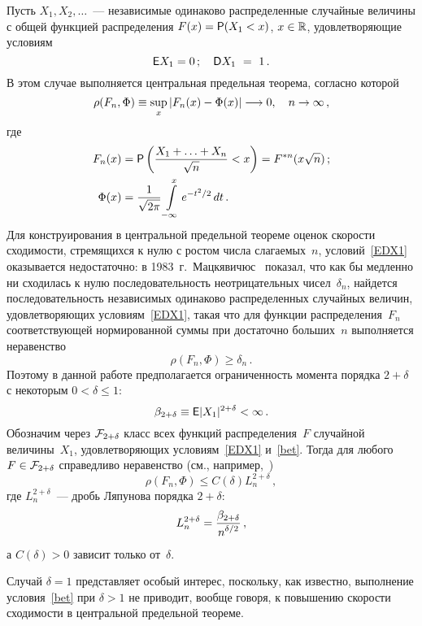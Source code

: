 \begin{multicols}{2}
Пусть $X_1,X_2,\ldots$~--- независимые одинаково распределенные
случайные величины с общей функцией распределения
${F(x)={\sf P}(X_1<x)}$, ${x\in\mathbb R}$, удов\-ле\-тво\-ря\-ющие условиям
\begin{equation}
\label{EDX1}
{\sf E} X_1 =  0\,;\quad{\sf D} X_1\ =\ 1\,.
\end{equation}
В этом случае выполняется центральная предельная теорема, согласно
которой
$$
\rho(F_n,\Phi)\equiv\sup_x|F_n(x)-\Phi(x)|\longrightarrow 0,\quad n\to\infty\,,
$$
где
\begin{align*}
F_n(x)&={\sf P}\left(\displaystyle\frac{\displaystyle X_1+\ldots+X_n\mathstrut}{\displaystyle \sqrt n\mathstrut}<x\right)=F^{*n}(x\sqrt n)\,;\\
\Phi(x)&=\displaystyle\frac{\displaystyle 1\mathstrut}{\displaystyle \sqrt{2\pi}\mathstrut}\int\limits_{-\infty}^x e^{-t^2/2}\,dt\,.
\end{align*}
Для конструирования в центральной предельной теореме оценок скорости
сходимости, стремящихся к нулю с ростом числа слагаемых~$n$,
условий~\eqref{EDX1} оказывается недостаточно: в 1983~г.\
Мацкявичюс~\cite{Matskjavichus1983} показал, что как бы
медленно ни сходилась к нулю последовательность неотрицательных
чисел~$\delta_n$, найдется последовательность независимых одинаково
распределенных случайных величин, удовлетворяющих
условиям~\eqref{EDX1}, такая что для функции распределения~$F_n$
соответствующей нормированной суммы при достаточно больших~$n$
выполняется неравенство
$$
\rho(F_n,\Phi)\ge\delta_n\,.
$$
Поэтому в данной работе предполагается ограниченность момента
порядка $2+\delta$ с некоторым $0<\delta\le1$:
\begin{equation}
\label{bet}
\beta_{2+\delta}\equiv {\sf E} |X_1|^{2+\delta}<\infty\,.
\end{equation}
Обозначим через ${\mathcal F}_{2+\delta}$ класс всех функций распределения~$F$
случайной величины~$X_1$, удов\-ле\-тво\-ря\-ющих  условиям~\eqref{EDX1}
и~\eqref{bet}. Тогда для любого $F\in{\mathcal F}_{2+\delta}$ справедливо
неравенство (см., например,~\cite{Petrov1972})
\begin{equation}
\label{Bikelis}
\rho(F_n,\Phi)\le C(\delta) L_n^{2+\delta}\,,
\end{equation}
где $L_n^{2+\delta}$~--- дробь Ляпунова порядка ${2+\delta}$:
$$
L_n^{2+\delta}=\displaystyle\frac{\displaystyle \beta_{2+\delta}\mathstrut}{\displaystyle n^{\delta/2}\mathstrut}\,,
$$
а $C(\delta)>0$ зависит только от~$\delta$.

Случай $\delta=1$ представляет особый интерес, поскольку, как известно,
выполнение условия~\eqref{bet} при $\delta>1$ не приводит, вообще
говоря, к повышению скорости сходимости в центральной предельной
тео\-реме.


\end{multicols}
